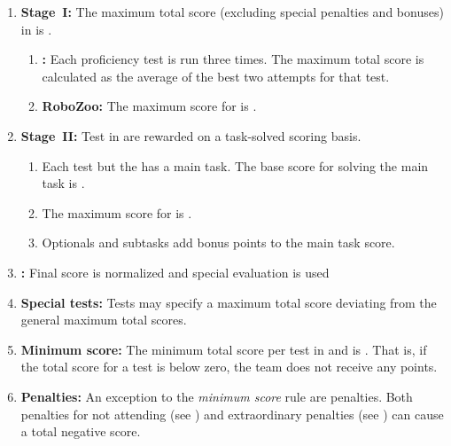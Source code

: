 \begin{enumerate}
	\item \textbf{Stage~I:} The maximum total score (excluding special penalties and bonuses) in  is .
	\begin{enumerate}
		\item \textbf{:} Each proficiency test is run three times. The maximum total score is calculated as the average of the best two attempts for that test.
		\item \textbf{RoboZoo:} The maximum score for  is .
	\end{enumerate}

	\item \textbf{Stage~II:} Test in  are rewarded on a task-solved scoring basis.
	\begin{enumerate}
		\item Each test but the  has a main task. The base score for solving the main task is .
		\item The maximum score for  is .
		\item Optionals and subtasks add bonus points to the main task score.
	\end{enumerate}

	\item \textbf{:} Final score is normalized and special evaluation is used

	\item \textbf{Special tests:} Tests may specify a maximum total score deviating from the general maximum total scores.

	\item \textbf{Minimum score:} The minimum total score per test in  and  is . That is, if the total score for a test is below zero, the team does not receive any points.

	\item \textbf{Penalties:} An exception to the \emph{minimum score} rule are penalties. Both penalties for not attending (see ) and extraordinary penalties (see ) can cause a total negative score. 


\end{enumerate}
